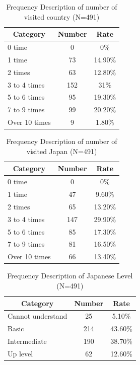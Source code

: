 \begin{table}[h]
  \caption[Frequency Description of number of visited country ]{Frequency Description of number of visited country (N=491)}
  \label{table28d}
  \centering
  \begin{tabular}{l|cc}
 \hline
\multicolumn{1}{c|}{Category}&Number&Rate\\
 \hline
0 time        & 0                    & 0\%                  \\
1 time        & 73                   & 14.90\%              \\
2 times       & 63                   & 12.80\%              \\
3 to 4 times  & 152                  & 31\%                 \\
5 to 6 times  & 95                   & 19.30\%              \\
7 to 9 times  & 99                   & 20.20\%              \\
Over 10 times & 9                    & 1.80\%               \\
 \hline
  \end{tabular}
\end{table}

\begin{table}[h]
  \caption[Frequency Description of number of visited Japan]{Frequency Description of number of visited Japan (N=491)}
  \label{table28e}
  \centering
  \begin{tabular}{l|cc}
 \hline
\multicolumn{1}{c|}{Category}&Number&Rate\\
 \hline
0 time        & 0   & 0\%     \\
1 time        & 47  & 9.60\%  \\
2 times       & 65  & 13.20\% \\
3 to 4 times  & 147 & 29.90\% \\
5 to 6 times  & 85  & 17.30\% \\
7 to 9 times  & 81  & 16.50\% \\
Over 10 times & 66  & 13.40\% \\
 \hline
  \end{tabular}
\end{table}

\begin{table}[h]
  \caption[Frequency Description of Japanese Level]{Frequency Description of Japanese Level (N=491)}
  \label{table28f}
  \centering
  \begin{tabular}{l|cc}
 \hline
\multicolumn{1}{c|}{Category}&Number&Rate\\
 \hline
Cannot understand                    & 25  & 5.10\%  \\
Basic        & 214 & 43.60\% \\
Intermediate & 190 & 38.70\% \\
Up level     & 62  & 12.60\% \\
 \hline
  \end{tabular}
\end{table}


